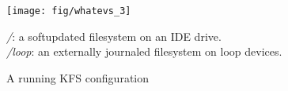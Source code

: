 \begin{figure}[htb]
  \centering
  \texttt{[image: fig/whatevs\_3]}
  \caption{A running KFS configuration}{{\it/}: a softupdated
    filesystem on an IDE drive.\\{\it/loop}: an externally journaled
    filesystem on loop devices.}
  \label{fig:kfs-graph}
\end{figure}
\vspace{-10pt}
